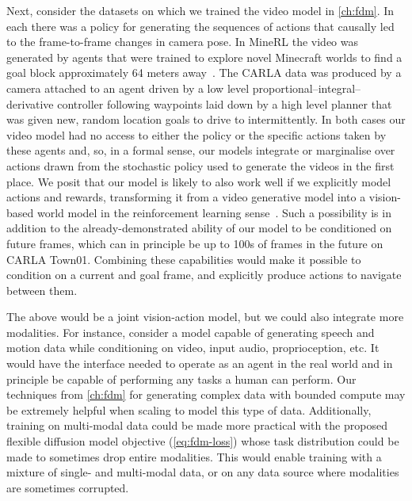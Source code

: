 Next, consider the datasets on which we trained the video model in \cref{ch:fdm}. In each there was a policy for generating the sequences of actions that causally led to the frame-to-frame changes in camera pose. In MineRL the video was generated by agents that were trained to explore novel Minecraft worlds to find a goal block approximately 64 meters away~\citep{saxena2021clockwork}. The CARLA data was produced by a camera attached to an agent driven by a low level proportional–integral–derivative controller following waypoints laid down by a high level planner that was given new, random location goals to
drive to intermittently. In both cases our video model had no access to either the policy or the specific actions taken by these agents and, so, in a formal sense, our models integrate or marginalise over actions drawn from the stochastic policy used to generate the videos in the first place. We posit that our model is likely to also work well if we explicitly model actions and rewards, transforming it from a video generative model into a vision-based world model in the reinforcement learning sense~\citep{kaiser2019model}. Such a possibility is in addition to the already-demonstrated ability of our model to be conditioned on future frames, which can in principle be up to 100s of frames in the future on CARLA Town01. Combining these capabilities would make it possible to condition on a current and goal frame, and explicitly produce actions to navigate between them.

The above would be a joint vision-action model, but we could also integrate more modalities. For instance, consider a model capable of generating speech and motion data while conditioning on video, input audio, proprioception, etc. It would have the interface needed to operate as an agent in the real world and in principle be capable of performing any tasks a human can perform. Our techniques from \cref{ch:fdm} for generating complex data with bounded compute may be extremely helpful when scaling to model this type of data. Additionally, training on multi-modal data could be made more practical with the proposed flexible diffusion model objective (\cref{eq:fdm-loss}) whose task distribution could be made to sometimes drop entire modalities. This would enable training with a mixture of single- and multi-modal data, or on any data source where modalities are sometimes corrupted.



